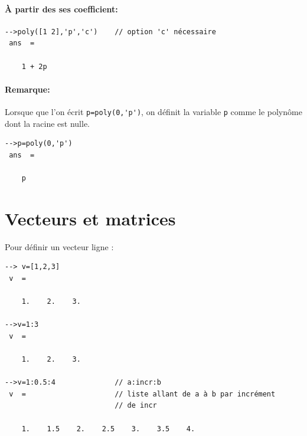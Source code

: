 \paragraph{\`A partir des ses coefficient:}

\begin{code}
\begin{verbatim}
-->poly([1 2],'p','c')    // option 'c' nécessaire
 ans  =
 
    1 + 2p
\end{verbatim}
\end{code}

\paragraph{Remarque:}
Lorsque que l'on écrit \verb?p=poly(0,'p')?, on définit la variable \verb?p? 
comme le polynôme dont la racine est nulle.
\begin{code}
\begin{verbatim}
-->p=poly(0,'p')
 ans  =

    p
\end{verbatim}
\end{code}


\section{Vecteurs et matrices}


Pour définir un vecteur ligne :
\begin{code}
\begin{verbatim}
--> v=[1,2,3]
 v  =
 
    1.    2.    3. 

-->v=1:3
 v  =
 
    1.    2.    3.

-->v=1:0.5:4              // a:incr:b
 v  =                     // liste allant de a à b par incrément 
                          // de incr
 
    1.    1.5    2.    2.5    3.    3.5    4.
\end{verbatim}
\end{code}

